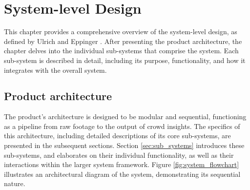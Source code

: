 \chapter{System-level Design}
\label{chap:system-level-design}

This chapter provides a comprehensive overview of the system-level design, as defined by Ulrich and Eppinger \cite{ulrich_eppinger}. After presenting the product architecture, the chapter delves into the individual sub-systems that comprise the system. Each sub-system is described in detail, including its purpose, functionality, and how it integrates with the overall system.

\section{Product architecture}

The product's architecture is designed to be modular and sequential, functioning as a pipeline from raw footage to the output of crowd insights. The specifics of this architecture, including detailed descriptions of its core sub-systems, are presented in the subsequent sections. Section \ref{sec:sub_systems} introduces these sub-systems, and elaborates on their individual functionality, as well as their interactions within the larger system framework. Figure \ref{fig:system_flowchart} illustrates an architectural diagram of the system, demonstrating its sequential nature.


